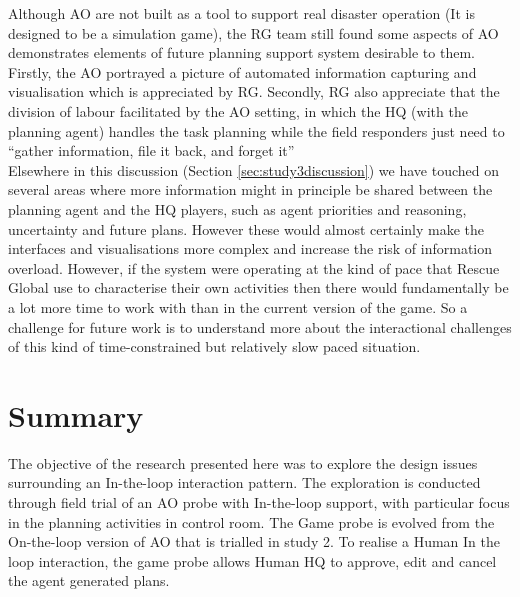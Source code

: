 Although \ac{AO} are not built as a tool to support real disaster operation (It is designed to be a simulation game), the \ac{RG} team still found some aspects of \ac{AO} demonstrates elements of future planning support system desirable to them. Firstly, the \ac{AO} portrayed a picture of automated information capturing and visualisation which is appreciated by \ac{RG}. Secondly, \ac{RG} also appreciate that the division of labour facilitated by the \ac{AO} setting, in which the HQ (with the planning agent) handles the task planning while the field responders just need to ``gather information, file it back, and forget it''\\

Elsewhere in this discussion (Section \ref{sec:study3discussion}) we have touched on several areas where more information might in principle be shared between the planning agent and the HQ players, such as agent priorities and reasoning, uncertainty and future plans. However these would almost certainly make the interfaces and visualisations more complex and increase the risk of information overload. However, if the system were operating at the kind of pace that Rescue Global use to characterise their own activities then there would fundamentally be a lot more time to work with than in the current version of the game. So a challenge for future work is to understand more about the interactional challenges of this kind of time-constrained but relatively slow paced situation.\\

\section{Summary}
The objective of the research presented here was to explore the design issues surrounding an In-the-loop interaction pattern. The exploration is conducted through field trial of an \acf{AO} probe with In-the-loop support, with particular focus in the planning activities in control room. The Game probe is evolved from the On-the-loop version of \ac{AO} that is trialled in study 2. To realise a Human In the loop interaction, the game probe allows Human HQ to approve, edit and cancel the agent generated plans. \\

